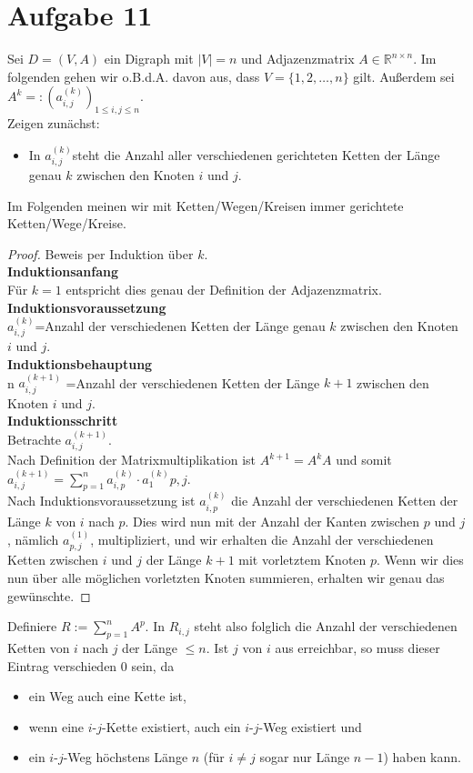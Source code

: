 \documentclass[a4paper,10pt,german]{scrartcl}
\newcommand{\R}{\ensuremath{\mathbb{R}}}
\newcommand{\ad}[2][k]{\ensuremath{a^{(#1)}_{#2}}}
\newcommand{\aij}[1][k]{\ad[#1]{i,j}}
\begin{document}
\section*{Aufgabe 11}
Sei $D=(V,A)$ ein Digraph mit $|V|=n$ und Adjazenzmatrix $A\in\R^{n\times n}$. Im folgenden gehen wir o.B.d.A. davon aus, dass $V=\{1,2,\dots,n\}$ gilt. Außerdem sei $A^k=:\left(\aij\right)_{1\leq i,j\leq n}$.\\
Zeigen zunächst: \begin{itemize}
                 \item[] In \aij steht die Anzahl aller verschiedenen gerichteten Ketten der Länge genau $k$ zwischen den Knoten $i$ und $j$.
                 \end{itemize}
Im Folgenden meinen wir mit Ketten/Wegen/Kreisen immer gerichtete Ketten/Wege/Kreise.
\begin{proof}
  Beweis per Induktion über $k$.\\
  {\bf Induktionsanfang}\\
  Für $k=1$ entspricht dies genau der Definition der Adjazenzmatrix.\\
  {\bf Induktionsvoraussetzung}\\
  \aij =Anzahl der verschiedenen Ketten der Länge genau $k$ zwischen den Knoten $i$ und $j$.\\
  {\bf Induktionsbehauptung}\\
  n \aij[k+1] =Anzahl der verschiedenen Ketten der Länge $k+1$ zwischen den Knoten $i$ und $j$.\\
  {\bf Induktionsschritt}\\
  Betrachte \aij[k+1].\\
  Nach Definition der Matrixmultiplikation ist $A^{k+1}=A^kA$ und somit $\aij[k+1]=\sum\limits_{p=1}^n\ad{i,p}\cdot \ad1{p,j}$.\\
  Nach Induktionsvoraussetzung ist \ad{i,p} die Anzahl der verschiedenen Ketten der Länge $k$ von $i$ nach $p$. Dies wird nun mit der Anzahl der Kanten zwischen $p$ und $j$, nämlich \ad[1]{p,j}, multipliziert, und wir erhalten die Anzahl der verschiedenen Ketten zwischen $i$ und $j$ der Länge $k+1$ mit vorletztem Knoten $p$. Wenn wir dies nun über alle möglichen vorletzten Knoten summieren, erhalten wir genau das gewünschte.
\end{proof}
Definiere $R:=\sum_{p=1}^nA^p$. In $R_{i,j}$ steht also folglich die Anzahl der verschiedenen Ketten von $i$ nach $j$ der Länge $\leq n$. Ist $j$ von $i$ aus erreichbar, so muss dieser Eintrag verschieden 0 sein, da
\begin{itemize}
 \item ein Weg auch eine Kette ist,
 \item wenn eine $i$-$j$-Kette existiert, auch ein $i$-$j$-Weg existiert und
 \item ein $i$-$j$-Weg höchstens Länge $n$ (für $i\neq j$ sogar nur Länge $n-1$) haben kann.
\end{itemize}
\end{document}
